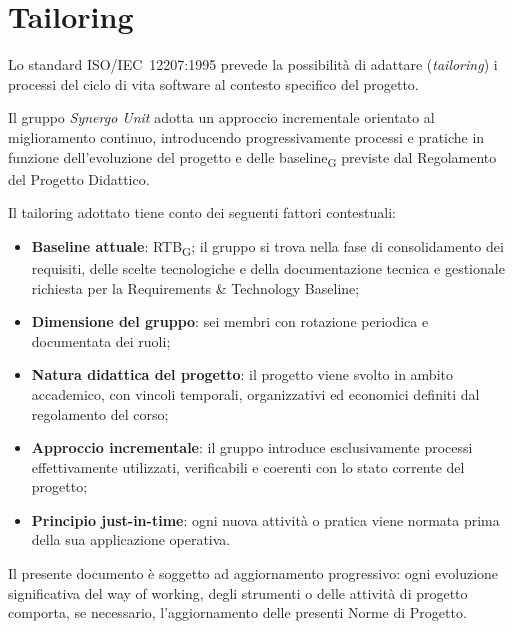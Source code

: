 
\section{Tailoring}
\label{sec:tailoring}

Lo standard ISO/IEC~12207:1995 prevede la possibilità di adattare
(\textit{tailoring}) i processi del ciclo di vita software al
contesto specifico del progetto.

Il gruppo \textit{Synergo Unit} adotta un approccio incrementale orientato al
miglioramento continuo, introducendo progressivamente processi e pratiche in
funzione dell'evoluzione del progetto e delle baseline\textsubscript{G} previste
dal Regolamento del Progetto Didattico.

Il tailoring adottato tiene conto dei seguenti fattori contestuali:

\begin{itemize}
    \item \textbf{Baseline attuale}: RTB\textsubscript{G}; il gruppo si trova nella
    fase di consolidamento dei requisiti, delle scelte tecnologiche e della
    documentazione tecnica e gestionale richiesta per la Requirements \& Technology
    Baseline;

    \item \textbf{Dimensione del gruppo}: sei membri con rotazione periodica e
    documentata dei ruoli;

    \item \textbf{Natura didattica del progetto}: il progetto viene svolto in ambito
    accademico, con vincoli temporali, organizzativi ed economici definiti dal
    regolamento del corso;

    \item \textbf{Approccio incrementale}: il gruppo introduce esclusivamente processi
    effettivamente utilizzati, verificabili e coerenti con lo stato corrente del
    progetto;

    \item \textbf{Principio just-in-time}: ogni nuova attività o pratica viene normata
    prima della sua applicazione operativa.
\end{itemize}

Il presente documento è soggetto ad aggiornamento progressivo: ogni evoluzione
significativa del way of working, degli strumenti o delle attività
di progetto comporta, se necessario, l'aggiornamento delle presenti Norme di
Progetto.

